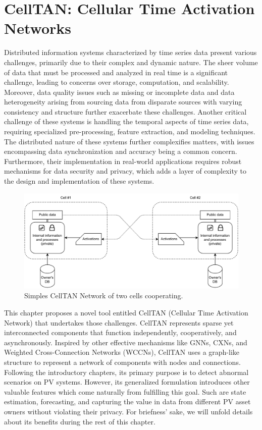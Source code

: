 \chapter{CellTAN: Cellular Time Activation Networks} \label{chap:chap4}

Distributed information systems characterized by time series data present various challenges, primarily due to their complex and dynamic nature. The sheer volume of data that must be processed and analyzed in real time is a significant challenge, leading to concerns over storage, computation, and scalability. Moreover, data quality issues such as missing or incomplete data and data heterogeneity arising from sourcing data from disparate sources with varying consistency and structure further exacerbate these challenges. Another critical challenge of these systems is handling the temporal aspects of time series data, requiring specialized pre-processing, feature extraction, and modeling techniques. The distributed nature of these systems further complexifies matters, with issues encompassing data synchronization and accuracy being a common concern. Furthermore, their implementation in real-world applications requires robust mechanisms for data security and privacy, which adds a layer of complexity to the design and implementation of these systems.

\begin{figure}[h!]
    \centering
    \includegraphics[width=12cm]{figures/chapter4/cell/intro.pdf}
    \caption{Simples CellTAN Network of two cells cooperating.}
    \label{fig:celltanintro}
\end{figure}

This chapter proposes a novel tool entitled CellTAN (Cellular Time Activation Network) that undertakes those challenges. CellTAN represents sparse yet interconnected components that function independently, cooperatively, and asynchronously. Inspired by other effective mechanisms like GNNs, CXNs, and Weighted Cross-Connection Networks (WCCNs), CellTAN uses a graph-like structure to represent a network of components with nodes and connections. Following the introductory chapters, its primary purpose is to detect abnormal scenarios on PV systems. However, its generalized formulation introduces other valuable features which come naturally from fulfilling this goal. Such are state estimation, forecasting, and capturing the value in data from different PV asset owners without violating their privacy. For briefness' sake, we will unfold details about its benefits during the rest of this chapter.

